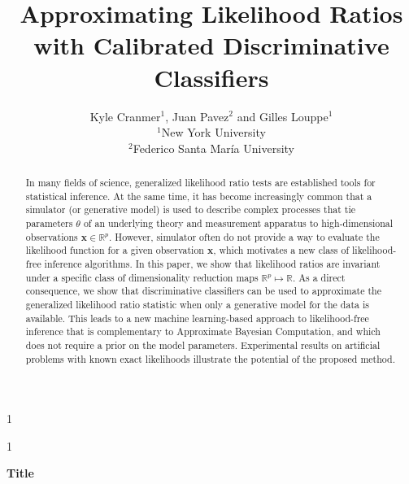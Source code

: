 \documentclass[12pt]{article}
\newcommand{\blind}{1}
\numberwithin{equation}{section}
\theoremstyle{plain}
\begin{document}
\def\spacingset#1{\renewcommand{\baselinestretch}%
{#1}\small\normalsize} \spacingset{1}



\blind
{
  \title{\bf Approximating Likelihood Ratios with Calibrated Discriminative Classifiers}
  \author{Kyle Cranmer$^1$, Juan Pavez$^2$ and Gilles Louppe$^1$\hspace{.2cm}\\
          $^1$New York University\\
          $^2$Federico Santa Mar\'ia University}
  \maketitle
} \fi

\blind
{
  \bigskip
  \bigskip
  \bigskip
  \begin{center}
    {\LARGE\bf Title}
\end{center}
  \medskip
} \fi

\bigskip
\begin{abstract}


In many fields of science, generalized likelihood ratio tests are established tools for
statistical inference.
 At the same time, it has become increasingly common that a simulator (or
generative model) is used to describe complex processes that tie parameters
$\theta$ of an underlying theory and measurement apparatus to high-dimensional
observations $\mathbf{x}\in \mathbb{R}^p$. However, simulator often do not provide a way to evaluate
the likelihood function for a given observation $\mathbf{x}$, which motivates a new class of likelihood-free
inference algorithms.
In this paper, we show that likelihood ratios are invariant under a specific class of dimensionality reduction maps $\mathbb{R}^p \mapsto \mathbb{R}$.  As a direct consequence, we show that discriminative classifiers can be used to
approximate the generalized likelihood ratio statistic when only a generative model for the data is
available. This leads to a new machine learning-based approach to likelihood-free inference that is complementary to Approximate Bayesian Computation, and which does not require a prior on the model parameters. Experimental results
on artificial problems with known exact likelihoods illustrate the potential of the proposed method.

\end{abstract}
\end{document}
